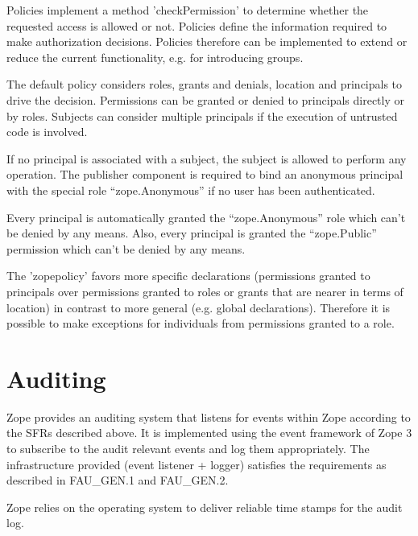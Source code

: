 \documentclass[12pt,english]{scrbook}
\begin{document}
Policies implement a method 'checkPermission' to determine whether the
requested access is allowed or not. Policies define the information required to
make authorization decisions.  Policies therefore can be implemented to extend
or reduce the current functionality, e.g. for introducing groups.

The default policy considers roles, grants and denials, location and principals
to drive the decision. Permissions can be granted or denied to principals
directly or by roles.  Subjects can consider multiple principals if the
execution of untrusted code is involved.

If no principal is associated with a subject, the subject is allowed to perform
any operation. The publisher component is required to bind an anonymous
principal with the special role ``zope.Anonymous'' if no user has been
authenticated.

Every principal is automatically granted the ``zope.Anonymous'' role which can't be
denied by any means. Also, every principal is granted the ``zope.Public''
permission which can't be denied by any means.

The 'zopepolicy' favors more specific declarations (permissions granted to
principals over permissions granted to roles or grants that are nearer in terms
of location) in contrast to more general (e.g. global declarations). Therefore
it is possible to make exceptions for individuals from permissions granted to a
role.





\section{Auditing}

Zope provides an auditing system that listens for events within Zope according
to the SFRs described above. It is implemented using the event framework of
Zope 3 to subscribe to the audit relevant events and log them appropriately.
The infrastructure provided (event listener + logger) satisfies the
requirements as described in FAU{\_}GEN.1 and FAU{\_}GEN.2.

Zope relies on the operating system to deliver reliable time stamps for the
audit log.


\end{document}
